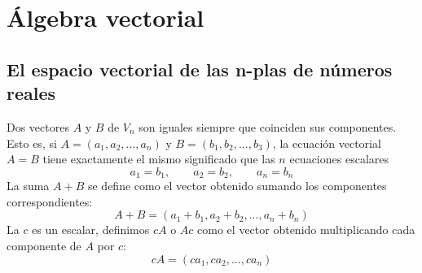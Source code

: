 \chapter{Álgebra vectorial}


\setcounter{section}{1}
\section{El espacio vectorial de las n-plas de números reales}

\begin{tcolorbox}[colframe = white]
    \begin{def.} Dos vectores $A$ y $B$ de $V_n$ son iguales siempre que coinciden sus componentes. Esto es, si $A=(a_1,a_2,...,a_n)$ y $B=(b_1,b_2,...,b_3)$, la ecuación vectorial $A=B$ tiene exactamente el mismo significado que las $n$ ecuaciones escalares $$a_1=b_1, \qquad a_2=b_2, \qquad a_n=b_n$$
    La suma $A+B$ se define como el vector obtenido sumando los componentes correspondientes: $$A+B = (a_1+b_1,a_2+b_2,...,a_n+b_n)$$
    La $c$ es un escalar, definimos $cA$ o $Ac$ como el vector obtenido multiplicando cada componente de $A$ por $c$: $$cA=(ca_1,ca_2,...,ca_n)$$
    \end{def.}
\end{tcolorbox}

